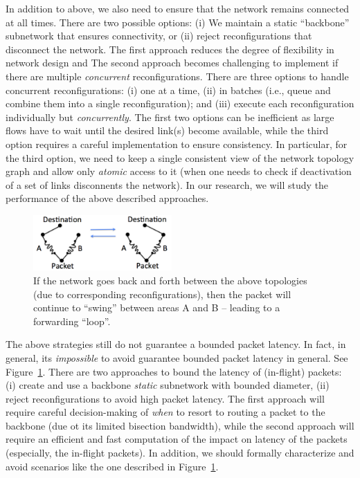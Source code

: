 In addition to above, we also need to ensure that the network remains
connected at all times. There are two possible options: (i) We
maintain a static ``backbone'' subnetwork that ensures connectivity,
or (ii) reject reconfigurations that disconnect the network. The first
approach reduces the degree of flexibility in network design and
The second approach becomes challenging to implement if there are
multiple {\em concurrent} reconfigurations. There are three options to
handle concurrent reconfigurations: (i) one at a time, (ii) in batches
(i.e., queue and combine them into a single reconfiguration); and
(iii) execute each reconfiguration individually but {\em
  concurrently}. The first two options can be inefficient as large
flows have to wait until the desired link(s) become available, while
the third option requires a careful implementation to ensure
consistency. In particular, for the third option, we need to keep a
single consistent view of the network topology graph and allow only
{\em atomic} access to it (when one needs to check if deactivation of
a set of links disconnents the network).  In our research, we will
study the performance of the above described approaches.

\begin{figure}
\vspace{-0.4cm}
\centering
\includegraphics[width=150pt]{PPTFigs/impossible.pdf}
\caption{If the network goes back and forth between the above
  topologies (due to corresponding reconfigurations), then the packet
  will continue to ``swing'' between areas A and B -- leading to a
  forwarding ``loop''.}
\label{fig:impossible}
\end{figure}
  The above
strategies still do not guarantee a bounded packet latency. In fact,
in general, its {\em impossible} to avoid guarantee bounded packet
latency in general. See Figure~\ref{fig:impossible}. There are two approaches to
bound the latency of (in-flight) packets: (i) create and use a
backbone {\em static} subnetwork with bounded diameter, (ii) reject
reconfigurations to avoid high packet latency. The first approach will
require careful decision-making of {\em when} to resort to routing a
packet to the backbone (due ot its limited bisection bandwidth), while
the second approach will require an efficient and fast computation of
the impact on latency of the packets (especially, the in-flight
packets). In addition, we should formally characterize and avoid 
scenarios like the one described in Figure~\ref{fig:impossible}.

